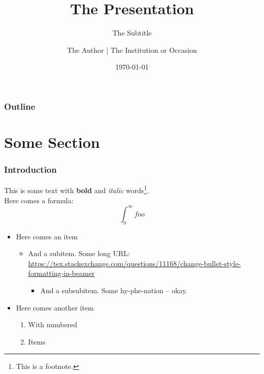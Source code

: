 \documentclass[t]{beamer}
\title{\Huge{%
    The Presentation
}}
\subtitle{\Large{%
    The Subtitle
}}
\author{\small{%
    The Author | The Institution or Occasion
}}
\date{\small{%
    \today
}}
\begin{document}

\newcommand{\highlightitem}[1]{
  \only<\currentsection>{\textcolor{highlight}{#1}}
  \only<\notcurrentsection>{\textcolor{faded}{#1}}
}
\begin{frame}
    \titlepage
\end{frame}

\begin{frame}
    \frametitle{Outline}
    \tableofcontents %
\end{frame}

\section{Some Section}
\begin{frame}
    \frametitle{Introduction}
    This is some text with \textbf{bold} and \textit{italic} words\footnote{This is a footnote.}.\\
    \pause
    Here comes a formula:
    \[
        \int_0^\infty foo
    \]
    \pause
    \begin{itemize}
        \item Here comes an item
            \begin{itemize}
                \item And a subitem. Some long URL:
                    \url{https://tex.stackexchange.com/questions/11168/change-bullet-style-formatting-in-beamer}
                    \begin{itemize}
                        \item And a subsubitem. Some hy-phe-nation -- okay.
                    \end{itemize}
            \end{itemize}
        \pause
        \item Here comes another item
            \begin{enumerate}
                \item With numbered
                    \pause
                \item Items
            \end{enumerate}
    \end{itemize}
\end{frame}
\end{document}
